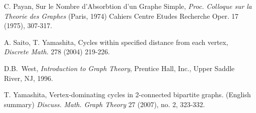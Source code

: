 \documentclass[12pt]{amsart}
\begin{document}
\begin{thebibliography}{99}
 C. Payan, Sur le Nombre d'Absorbtion d'un Graphe Simple, {\it{Proc. Colloque sur la Theorie des Graphes}} (Paris, 1974) Cahiers Centre Etudes Recherche Oper. 17 (1975), 307-317.

 A. Saito, T. Yamashita, Cycles within specified distance from each vertex, {\it Discrete Math.} 278 (2004) 219-226.

D.B.~West,
{\it Introduction to Graph Theory},
Prentice Hall, Inc.,
Upper Saddle River, NJ, 1996.

 T. Yamashita, Vertex-dominating cycles in 2-connected bipartite graphs. (English summary) 
{\it{Discuss. Math. Graph Theory}} 27 (2007), no. 2, 323-332. 
\end{thebibliography}
\end{document}
